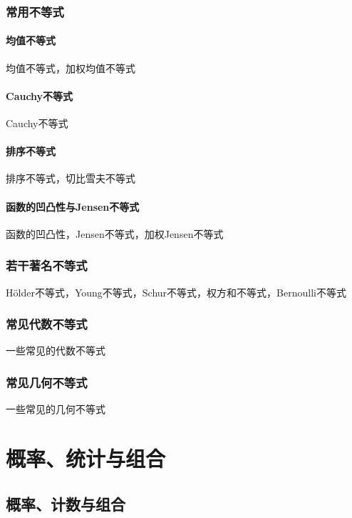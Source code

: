 \documentclass[lang=cn, zihao=4.5]{elegantbook}
\begin{document}
\section{常用不等式}

\subsection{均值不等式}

均值不等式，加权均值不等式

\subsection{Cauchy不等式}

Cauchy不等式

\subsection{排序不等式}

排序不等式，切比雪夫不等式

\subsection{函数的凹凸性与Jensen不等式}

函数的凹凸性，Jensen不等式，加权Jensen不等式

\section{若干著名不等式}

Hölder不等式，Young不等式，Schur不等式，权方和不等式，Bernoulli不等式

\section{常见代数不等式}

一些常见的代数不等式

\section{常见几何不等式}

一些常见的几何不等式

\part{概率、统计与组合}

\chapter{概率、计数与组合}
\end{document}
